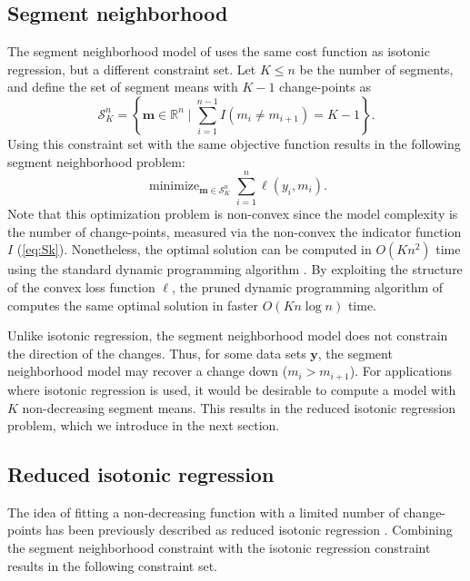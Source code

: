 \documentclass{article}
\DeclareMathOperator*{\minimize}{minimize}
\newcommand{\RR}{\mathbb R}
\begin{document}
\subsection{Segment neighborhood}

The segment neighborhood model of \citet{segment-neighborhood} uses
the same cost function as isotonic regression, but a different
constraint set. Let $K\leq n$ be the number of segments, and define
the set of segment means with $K-1$ change-points as
\begin{equation}
  \label{eq:Sk}
  \mathcal S_K^n = \left\{
  \mathbf m\in\RR^n
  \mid
  \sum_{i=1}^{n-1} I(m_i \neq m_{i+1}) = K-1
  \right\}.
\end{equation}
Using this constraint set with the same objective function results in
the following segment neighborhood problem:
\begin{equation}
  \label{eq:optimal_segment_neighborhood}
  \minimize_{\mathbf m\in\mathcal S_K^n} \sum_{i=1}^n \ell(y_i, m_i).
\end{equation}
Note that this optimization problem is non-convex since the model
complexity is the number of change-points, measured via the non-convex
the indicator function $I$ (\ref{eq:Sk}). Nonetheless, the optimal
solution can be computed in $O(K n^2)$ time using the standard dynamic
programming algorithm \citep{segment-neighborhood}. By exploiting the
structure of the convex loss function $\ell$, the pruned dynamic
programming algorithm of \citet{pruned-dp} computes the same optimal
solution in faster $O(K n \log n)$ time.

Unlike isotonic regression, the segment neighborhood model does not
constrain the direction of the changes. Thus, for some data sets
$\mathbf y$, the segment neighborhood model may recover a change down
($m_i > m_{i+1}$). For applications where isotonic regression is used,
it would be desirable to compute a model with $K$ non-decreasing
segment means. This results in the reduced isotonic regression
problem, which we introduce in the next section.

\subsection{Reduced isotonic regression}

The idea of fitting a non-decreasing function with a limited number of
change-points has been previously described as reduced isotonic
regression \citep{reduced-monotonic-regression}. Combining the segment
neighborhood constraint with the isotonic regression
constraint results in the following constraint set.
\end{document}
